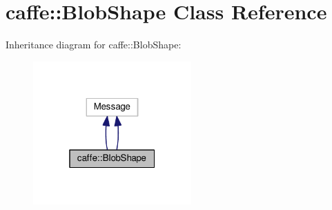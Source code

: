 \hypertarget{classcaffe_1_1_blob_shape}{}\section{caffe\+:\+:Blob\+Shape Class Reference}
\label{classcaffe_1_1_blob_shape}


Inheritance diagram for caffe\+:\+:Blob\+Shape\+:
\nopagebreak
\begin{figure}[H]
\begin{center}
\leavevmode
\includegraphics[width=172pt]{classcaffe_1_1_blob_shape__inherit__graph}
\end{center}
\end{figure}
